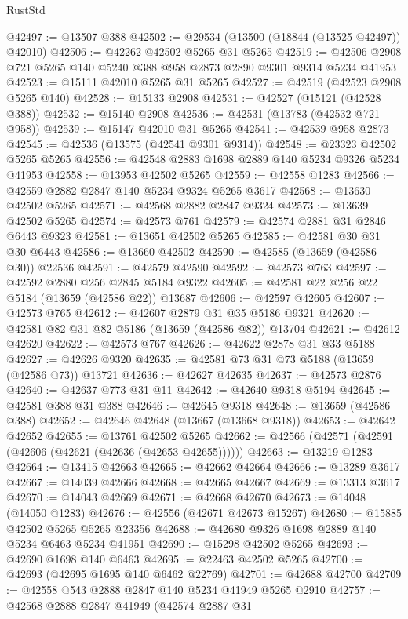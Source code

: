 \begin{lexlean}{RustStd}
\begin{coremodule}
@42497 := @13507 @388
@42502 := @29534 (@13500 (@18844 (@13525 @42497)) @42010)
@42506 := @42262 @42502 @5265 @31 @5265
@42519 := @42506 @2908 @721 @5265 @140 @5240 @388 @958 @2873 @2890 @9301 @9314 @5234 @41953
@42523 := @15111 @42010 @5265 @31 @5265
@42527 := @42519 (@42523 @2908 @5265 @140)
@42528 := @15133 @2908
@42531 := @42527 (@15121 (@42528 @388))
@42532 := @15140 @2908
@42536 := @42531 (@13783 (@42532 @721 @958))
@42539 := @15147 @42010 @31 @5265
@42541 := @42539 @958 @2873
@42545 := @42536 (@13575 (@42541 @9301 @9314))
@42548 := @23323 @42502 @5265 @5265
@42556 := @42548 @2883 @1698 @2889 @140 @5234 @9326 @5234 @41953
@42558 := @13953 @42502 @5265
@42559 := @42558 @1283
@42566 := @42559 @2882 @2847 @140 @5234 @9324 @5265 @3617
@42568 := @13630 @42502 @5265
@42571 := @42568 @2882 @2847 @9324
@42573 := @13639 @42502 @5265
@42574 := @42573 @761
@42579 := @42574 @2881 @31 @2846 @6443 @9323
@42581 := @13651 @42502 @5265
@42585 := @42581 @30 @31 @30 @6443
@42586 := @13660 @42502
@42590 := @42585 (@13659 (@42586 @30)) @22536
@42591 := @42579 @42590
@42592 := @42573 @763
@42597 := @42592 @2880 @256 @2845 @5184 @9322
@42605 := @42581 @22 @256 @22 @5184 (@13659 (@42586 @22)) @13687
@42606 := @42597 @42605
@42607 := @42573 @765
@42612 := @42607 @2879 @31 @35 @5186 @9321
@42620 := @42581 @82 @31 @82 @5186 (@13659 (@42586 @82)) @13704
@42621 := @42612 @42620
@42622 := @42573 @767
@42626 := @42622 @2878 @31 @33 @5188
@42627 := @42626 @9320
@42635 := @42581 @73 @31 @73 @5188 (@13659 (@42586 @73)) @13721
@42636 := @42627 @42635
@42637 := @42573 @2876
@42640 := @42637 @773 @31 @11
@42642 := @42640 @9318 @5194
@42645 := @42581 @388 @31 @388
@42646 := @42645 @9318
@42648 := @13659 (@42586 @388)
@42652 := @42646 @42648 (@13667 (@13668 @9318))
@42653 := @42642 @42652
@42655 := @13761 @42502 @5265
@42662 := @42566 (@42571 (@42591 (@42606 (@42621 (@42636 (@42653 @42655))))))
@42663 := @13219 @1283
@42664 := @13415 @42663
@42665 := @42662 @42664
@42666 := @13289 @3617
@42667 := @14039 @42666
@42668 := @42665 @42667
@42669 := @13313 @3617
@42670 := @14043 @42669
@42671 := @42668 @42670
@42673 := @14048 (@14050 @1283)
@42676 := @42556 (@42671 @42673 @15267)
@42680 := @15885 @42502 @5265 @5265 @23356
@42688 := @42680 @9326 @1698 @2889 @140 @5234 @6463 @5234 @41951
@42690 := @15298 @42502 @5265
@42693 := @42690 @1698 @140 @6463
@42695 := @22463 @42502 @5265
@42700 := @42693 (@42695 @1695 @140 @6462 @22769)
@42701 := @42688 @42700
@42709 := @42558 @543 @2888 @2847 @140 @5234 @41949 @5265 @2910
@42757 := @42568
    @2888
    @2847
    @41949
    (@42574
      @2887
      @31

\end{coremodule}
\end{lexlean}
